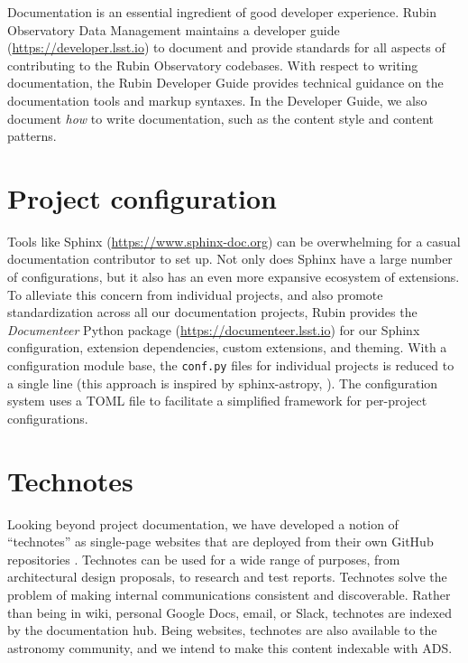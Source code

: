 \documentclass[11pt,twoside]{article}
\begin{document}
Documentation is an essential ingredient of good developer experience.
Rubin Observatory Data Management maintains a developer guide (\url{https://developer.lsst.io}) to document and provide standards for all aspects of contributing to the Rubin Observatory codebases.
With respect to writing documentation, the Rubin Developer Guide provides technical guidance on the documentation tools and markup syntaxes.
In the Developer Guide, we also document \emph{how} to write documentation, such as the content style and content patterns.

\section{Project configuration}

Tools like Sphinx (\url{https://www.sphinx-doc.org}) can be overwhelming for a casual documentation contributor to set up.
Not only does Sphinx have a large number of configurations, but it also has an even more expansive ecosystem of extensions.
To alleviate this concern from individual projects, and also promote standardization across all our documentation projects, Rubin provides the \textit{Documenteer} Python package (\url{https://documenteer.lsst.io}) for our Sphinx configuration, extension dependencies, custom extensions, and theming.
With a configuration module base, the \texttt{conf.py} files for individual projects is reduced to a single line (this approach is inspired by sphinx-astropy, \citet{thomas_robitaille_2023_8015243}).
The configuration system uses a TOML file to facilitate a simplified framework for per-project configurations.


\label{sec:technotes}
\section{Technotes}

Looking beyond project documentation, we have developed a notion of ``technotes'' as single-page websites that are deployed from their own GitHub repositories \citep{SQR-000}.
Technotes can be used for a wide range of purposes, from architectural design proposals, to research and test reports.
Technotes solve the problem of making internal communications consistent and discoverable.
Rather than being in wiki, personal Google Docs, email, or Slack, technotes are indexed by the documentation hub.
Being websites, technotes are also available to the astronomy community, and we intend to make this content indexable with ADS.
\end{document}
